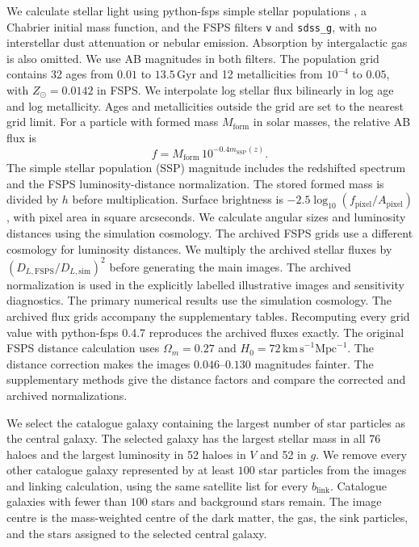 \documentclass[usenatbib]{mnras}
\begin{document}
We calculate stellar light using python-fsps simple stellar populations
\citep{conroy2009}, a Chabrier initial mass function, and the FSPS
filters \texttt{v} and \texttt{sdss\_g}, with no interstellar dust
attenuation or nebular emission.
Absorption by intergalactic gas is also omitted.
We use AB magnitudes in both filters.
The population grid contains 32 ages from $0.01$ to
$13.5\,\mathrm{Gyr}$ and 12 metallicities from $10^{-4}$ to $0.05$,
with $Z_{\odot}=0.0142$ in FSPS.
We interpolate log stellar flux bilinearly in log age and log metallicity.
Ages and metallicities outside the grid are set to the nearest grid limit.
For a particle with formed mass $M_{\mathrm{form}}$ in solar masses,
the relative AB flux is
\begin{equation}
f=M_{\mathrm{form}}\,10^{-0.4m_{\mathrm{SSP}}(z)}.
\label{eq:stellarflux}
\end{equation}
The simple stellar population (SSP) magnitude includes the redshifted
spectrum and the FSPS luminosity-distance normalization.
The stored formed mass is divided by $h$ before multiplication.
Surface brightness is $-2.5\log_{10}(f_{\mathrm{pixel}}/A_{\mathrm{pixel}})$,
with pixel area in square arcseconds.
We calculate angular sizes and luminosity distances using the simulation
cosmology. The archived FSPS grids use a different cosmology for
luminosity distances. We multiply the archived stellar fluxes by
$(D_{L,\mathrm{FSPS}}/D_{L,\mathrm{sim}})^2$ before generating the main
images. The archived normalization is used in the explicitly labelled
illustrative images and sensitivity diagnostics. The primary numerical
results use the simulation cosmology.
The archived flux grids accompany the supplementary tables.
Recomputing every grid value with python-fsps 0.4.7 reproduces the
archived fluxes exactly. The original FSPS distance calculation uses
$\Omega_m=0.27$ and $H_0=72\,\mathrm{km\,s}^{-1}\mathrm{Mpc}^{-1}$.
The distance correction makes the images $0.046$--$0.130$ magnitudes
fainter. The supplementary methods give the distance factors and compare
the corrected and archived normalizations.

We select the catalogue galaxy containing the largest number of star
particles as the central galaxy. The selected galaxy has the largest
stellar mass in all 76 haloes and the largest luminosity in 52 haloes
in $V$ and 52 in $g$. We remove every other catalogue galaxy
represented by at least $100$ star particles from the images and linking
calculation, using the same satellite list for every $b_{\mathrm{link}}$.
Catalogue galaxies with fewer than $100$ stars and background stars remain.
The image centre is the mass-weighted centre of the dark matter, the gas,
the sink particles, and the stars assigned to the selected central galaxy.
\end{document}
